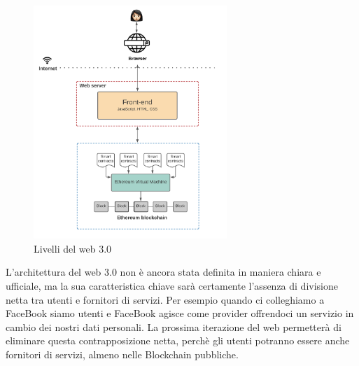 \begin{figure}[h]
    \caption{Livelli del web 3.0}
    \centering
    \includegraphics[width=0.65\textwidth]{Immagini/web_30.png}
\end{figure}
L'architettura del web 3.0 non è ancora stata definita in maniera chiara e ufficiale, ma la sua caratteristica chiave sarà certamente l'assenza
di divisione netta tra utenti e fornitori di servizi. Per esempio quando ci colleghiamo a FaceBook siamo utenti e FaceBook agisce come provider 
offrendoci un servizio in cambio dei nostri dati personali. La prossima iterazione del web permetterà di eliminare questa contrapposizione netta, perchè
gli utenti potranno essere anche fornitori di servizi, almeno nelle Blockchain pubbliche.

